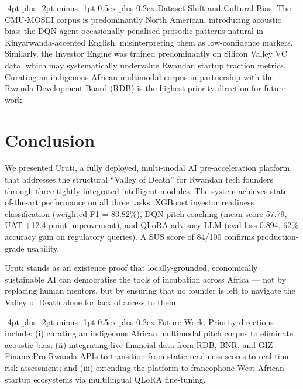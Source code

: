 \documentclass{article}
\makeatletter
\renewcommand\paragraph{\@startsection{paragraph}{4}{\z@}%
  {-4pt plus -2pt minus -1pt}%
  {0.5ex plus 0.2ex}%
  {\normalsize\bf}}
\makeatother
\begin{document}
\paragraph{Dataset Shift and Cultural Bias.}
The CMU-MOSEI corpus is predominantly North American, introducing acoustic
bias: the DQN agent occasionally penalised prosodic patterns natural in
Kinyarwanda-accented English, misinterpreting them as low-confidence markers.
Similarly, the Investor Engine was trained predominantly on Silicon Valley
VC data, which may systematically undervalue Rwandan startup traction metrics.
Curating an indigenous African multimodal corpus in partnership with the
Rwanda Development Board (RDB) is the highest-priority direction for future work.


\FloatBarrier
\section{Conclusion}

We presented Uruti, a fully deployed, multi-modal AI pre-acceleration platform
that addresses the structural ``Valley of Death'' for Rwandan tech founders
through three tightly integrated intelligent modules. The system achieves
state-of-the-art performance on all three tasks: XGBoost investor readiness
classification (weighted F1 = 83.82\%), DQN pitch coaching (mean score 57.79,
UAT +12.4-point improvement), and QLoRA advisory LLM (eval loss 0.894, 62\%
accuracy gain on regulatory queries). A SUS score of 84/100 confirms
production-grade usability.

Uruti stands as an existence proof that locally-grounded, economically
sustainable AI can democratise the tools of incubation across Africa --- not by
replacing human mentors, but by ensuring that no founder is left to navigate
the Valley of Death alone for lack of access to them.

\paragraph{Future Work.}
Priority directions include: (i) curating an indigenous African multimodal
pitch corpus to eliminate acoustic bias; (ii) integrating live financial
data from RDB, BNR, and GIZ-FinancePro Rwanda APIs to transition from
static readiness scores to real-time risk assessment; and (iii) extending
the platform to francophone West African startup ecosystems via multilingual
QLoRA fine-tuning.
\end{document}
